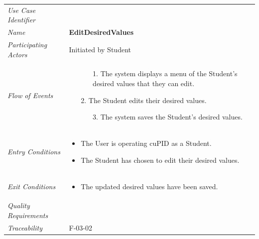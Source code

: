 \documentclass[12pt,letterpaper]{article}
\begin{document}
\begin{center}
	\begin{tabu} to 
		\toprule
		Use Case Identifier & \editdesiredvalues{} \\
		Name & {\bf EditDesiredValues} \\
		Participating Actors & Initiated by Student \\
		Flow of Events & 
		\begin{minipage}[t]{\linewidth}
		    \begin{enumerate}
		        \item[]
		        \begin{enumerate}
				    \item[1.] The system displays a menu of the Student's desired values that they can edit.
		        \end{enumerate}
	            \item[2.] The Student edits their desired values.
	            \begin{enumerate}
				    \item[3.] The system saves the Student's desired values.
		        \end{enumerate}
			\end{enumerate}		
		\end{minipage} \\

		Entry Conditions &
		\begin{minipage}[t]{\linewidth}
			\begin{itemize}
			    \item The User is operating cuPID as a Student.
			    \item The Student has chosen to edit their desired values.
	        \end{itemize}
		\end{minipage} \\

		Exit Conditions &
		\begin{minipage}[t]{\linewidth}
			\begin{itemize}
			    \item The updated desired values have been saved.
	        \end{itemize}
		\end{minipage} \\

		Quality Requirements & \\

		Traceability &  F-03-02\\
		\toprule
	\end{tabu}
\end{center}
\end{document}
